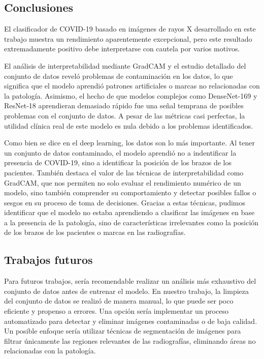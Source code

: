 \documentclass[es]{uc3mreport}
\begin{document}
\begin{report}
    \section{Conclusiones}
    
    El clasificador de COVID-19 basado en imágenes de rayos X desarrollado en este trabajo muestra un rendimiento aparentemente excepcional, pero este resultado extremadamente positivo debe interpretarse con cautela por varios motivos.
    
    El análisis de interpretabilidad mediante GradCAM y el estudio detallado del conjunto de datos reveló problemas de contaminación en los datos, lo que significa que el modelo aprendió patrones artificiales o marcas no relacionadas con la patología. Asimismo, el hecho de que modelos complejos como DenseNet-169 y ResNet-18 aprendieran demasiado rápido fue una señal temprana de posibles problemas con el conjunto de datos. A pesar de las métricas casi perfectas, la utilidad clínica real de este modelo es nula debido a los problemas identificados.
    
    Como bien se dice en el deep learning, los datos son lo más importante. Al tener un conjunto de datos contaminado, el modelo aprendió no a indentificar la presencia de COVID-19, sino a identificar la posición de los brazos de los pacientes. También destaca el valor de las técnicas de interpretabilidad como GradCAM, que nos permiten no solo evaluar el rendimiento numérico de un modelo, sino también comprender su comportamiento y detectar posibles fallos o sesgos en su proceso de toma de decisiones. Gracias a estas técnicas, pudimos identificar que el modelo no estaba aprendiendo a clasificar las imágenes en base a la presencia de la patología, sino de características irrelevantes como la posición de los brazos de los pacientes o marcas en las radiografías. 

    \subsection{Trabajos futuros}
    Para futuros trabajos, sería recomendable realizar un análisis más exhaustivo del conjunto de datos antes de entrenar el modelo. En nuestro trabajo, la limpieza del conjunto de datos se realizó de manera manual, lo que puede ser poco eficiente y propenso a errores. Una opción sería implementar un proceso automatizado para detectar y eliminar imágenes contaminadas o de baja calidad. Un posible enfoque sería utilizar técnicas de segmentación de imágenes \cite{ravi2024sam2segmentimages} \cite{Tartaglione_2020} para filtrar únicamente las regiones relevantes de las radiografías, eliminando áreas no relacionadas con la patología. 


\end{report}
\end{document}
